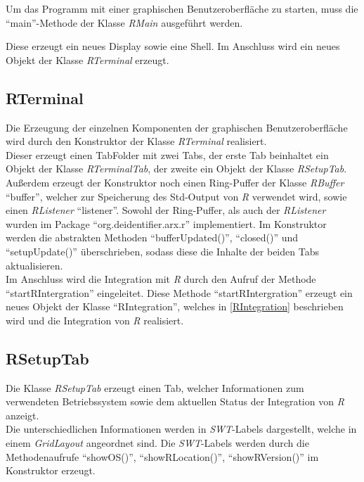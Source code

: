 \documentclass[a4paper, 12pt]{report} %
\begin{document}
Um das Programm mit einer graphischen Benutzeroberfläche zu starten, muss die "`main"'-Methode der Klasse \textit{RMain} ausgeführt werden. 

Diese erzeugt ein neues Display sowie eine Shell. Im Anschluss wird ein neues Objekt der Klasse \textit{RTerminal} erzeugt.

\subsection{RTerminal}

Die Erzeugung der einzelnen Komponenten der graphischen Benutzeroberfläche wird durch den Konstruktor der Klasse \textit{RTerminal} realisiert.\\

Dieser erzeugt einen TabFolder mit zwei Tabs, der erste Tab beinhaltet ein Objekt der Klasse \textit{RTerminalTab}, der zweite ein Objekt der Klasse \textit{RSetupTab}.
Außerdem erzeugt der Konstruktor noch einen Ring-Puffer der Klasse \textit{RBuffer} "`buffer"', welcher zur Speicherung des Std-Output von \textit{R} verwendet wird, sowie einen \textit{RListener} "`listener"'. Sowohl der Ring-Puffer, als auch der \textit{RListener} wurden im Package "`org.deidentifier.arx.r"' implementiert.
Im Konstruktor werden die abstrakten Methoden "`bufferUpdated()"', "`closed()"' und "`setupUpdate()"' überschrieben, sodass diese die Inhalte der beiden Tabs aktualisieren.\\

Im Anschluss wird die Integration mit \textit{R} durch den Aufruf der Methode "`startRIntergration"' eingeleitet.
Diese Methode "`startRIntergration"' erzeugt ein neues Objekt der Klasse "`RIntegration"', welches in \ref{RIntegration} beschrieben wird und die Integration von \textit{R} realisiert.


\subsection{RSetupTab}

Die Klasse \textit{RSetupTab} erzeugt einen Tab, welcher Informationen zum verwendeten Betriebssystem sowie dem aktuellen Status der Integration von \textit{R} anzeigt.\\

Die unterschiedlichen Informationen werden in \textit{SWT}-Labels dargestellt, welche in einem \textit{GridLayout} angeordnet sind.
Die \textit{SWT}-Labels werden durch die Methodenaufrufe "`showOS()"', "`showRLocation()"', "`showRVersion()"' im Konstruktor erzeugt.
\end{document}
